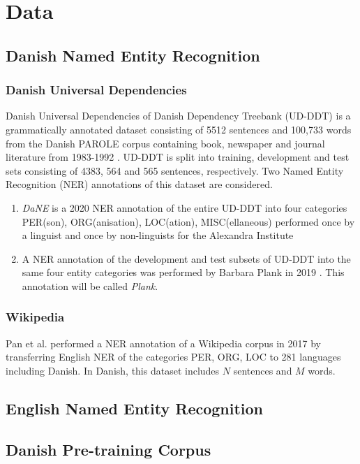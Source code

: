 \documentclass[main.tex]{subfiles}
\begin{document}
\chapter{Data}

\section{Danish Named Entity Recognition}
\subsection{Danish Universal Dependencies}
Danish Universal Dependencies of Danish Dependency Treebank (UD-DDT) \cite{johann2015udddt} is a grammatically annotated dataset consisting of 5512 sentences and 100,733 words from the Danish PAROLE corpus containing book, newspaper and journal literature from 1983-1992 \cite{christensen1998parole}.
UD-DDT is split into training, development and test sets consisting of 4383, 564 and 565 sentences, respectively.
Two Named Entity Recognition (NER) annotations of this dataset are considered.
\begin{enumerate}
    \item \emph{DaNE} is a 2020 NER annotation of the entire UD-DDT into four categories PER(son), ORG(anisation), LOC(ation), MISC(ellaneous) performed once by a linguist and once by non-linguists for the Alexandra Institute \cite[Sec. 4]{hvingelby2020dane}
    \item A NER annotation of the development and test subsets of UD-DDT into the same four entity categories was performed by Barbara Plank in 2019 \cite{plank2019neural}.
        This annotation will be called \emph{Plank}.
\end{enumerate}

\subsection{Wikipedia}
Pan et al. performed a NER annotation of a Wikipedia corpus in 2017 by transferring English NER of the categories PER, ORG, LOC to 281 languages including Danish.
In Danish, this dataset includes $N$ sentences and $M$ words.

\section{English Named Entity Recognition}

\section{Danish Pre-training Corpus}
\end{document}
